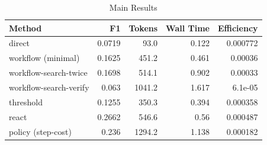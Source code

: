 \begin{table}[t]
\centering
\small
\caption{Main Results}
\begin{tabular}{lrrrr}
\hline
Method & F1 & Tokens & Wall Time & Efficiency \\
\hline
direct & 0.0719 & 93.0 & 0.122 & 0.000772 \\
workflow (minimal) & 0.1625 & 451.2 & 0.461 & 0.00036 \\
workflow-search-twice & 0.1698 & 514.1 & 0.902 & 0.00033 \\
workflow-search-verify & 0.063 & 1041.2 & 1.617 & 6.1e-05 \\
threshold & 0.1255 & 350.3 & 0.394 & 0.000358 \\
react & 0.2662 & 546.6 & 0.56 & 0.000487 \\
policy (step-cost) & 0.236 & 1294.2 & 1.138 & 0.000182 \\
\hline
\end{tabular}
\end{table}
